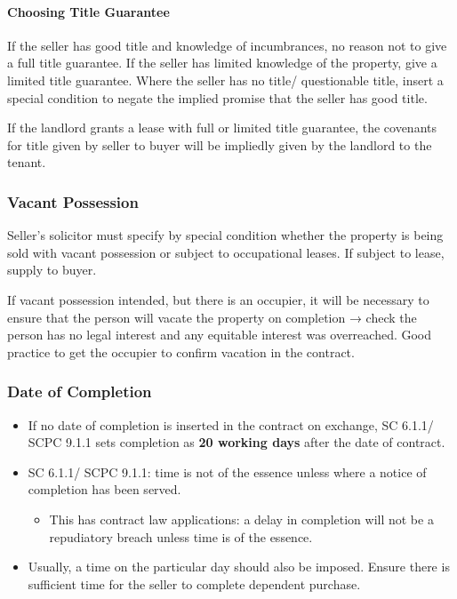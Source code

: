 \documentclass[
]{article}
\providecommand{\tightlist}{%
  \setlength{\itemsep}{0pt}\setlength{\parskip}{0pt}}
\begin{document}
\hypertarget{choosing-title-guarantee}{%
\paragraph{Choosing Title Guarantee}\label{choosing-title-guarantee}}

If the seller has good title and knowledge of incumbrances, no reason
not to give a full title guarantee. If the seller has limited knowledge
of the property, give a limited title guarantee. Where the seller has no
title/ questionable title, insert a special condition to negate the
implied promise that the seller has good title.

If the landlord grants a lease with full or limited title guarantee, the
covenants for title given by seller to buyer will be impliedly given by
the landlord to the tenant.

\hypertarget{vacant-possession}{%
\subsubsection{Vacant Possession}\label{vacant-possession}}

Seller's solicitor must specify by special condition whether the
property is being sold with vacant possession or subject to occupational
leases. If subject to lease, supply to buyer.

If vacant possession intended, but there is an occupier, it will be
necessary to ensure that the person will vacate the property on
completion → check the person has no legal interest and any equitable
interest was overreached. Good practice to get the occupier to confirm
vacation in the contract.

\hypertarget{date-of-completion}{%
\subsubsection{Date of Completion}\label{date-of-completion}}

\begin{itemize}
\tightlist
\item
  If no date of completion is inserted in the contract on exchange, SC
  6.1.1/ SCPC 9.1.1 sets completion as \textbf{20 working days} after
  the date of contract.
\item
  SC 6.1.1/ SCPC 9.1.1: time is not of the essence unless where a notice
  of completion has been served.

  \begin{itemize}
  \tightlist
  \item
    This has contract law applications: a delay in completion will not
    be a repudiatory breach unless time is of the essence.
  \end{itemize}
\item
  Usually, a time on the particular day should also be imposed. Ensure
  there is sufficient time for the seller to complete dependent
  purchase.
\end{itemize}
\end{document}
